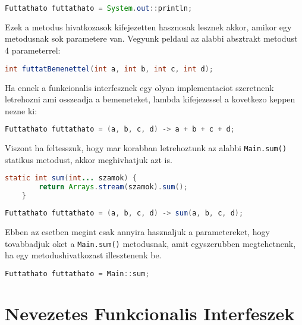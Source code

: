 \documentclass{article}
\let\l\lstinline
\begin{document}
\begin{lstlisting}[language=Java, caption=Metodus hivatkozas]
Futtathato futtathato = System.out::println;
\end{lstlisting}

Ezek a metodus hivatkozasok kifejezetten hasznosak lesznek akkor, amikor egy metodusnak sok parametere van. Vegyunk peldaul az alabbi absztrakt metodust 4 parameterrel:

\begin{lstlisting}[language=Java, caption=Absztrakt metodus 4 parameterrel]
int futtatBemenettel(int a, int b, int c, int d);
\end{lstlisting}

Ha ennek a funkcionalis interfesznek egy olyan implementaciot szeretnenk letrehozni ami osszeadja a bemeneteket, lambda kifejezessel a kovetkezo keppen nezne ki:

\begin{lstlisting}[language=Java, caption=Lambda implementacio]
Futtathato futtathato = (a, b, c, d) -> a + b + c + d;
\end{lstlisting}

\newpage

Viszont ha feltesszuk, hogy mar korabban letrehoztunk az alabbi \l{Main.sum()} statikus metodust, akkor meghivhatjuk azt is.

\begin{lstlisting}[language=Java, caption=Sum() metodus]
	static int sum(int... szamok) {
		return Arrays.stream(szamok).sum();
	}
\end{lstlisting}

\begin{lstlisting}[language=Java, caption=Lambda implementacio metodushivassal]
Futtathato futtathato = (a, b, c, d) -> sum(a, b, c, d);
\end{lstlisting}

Ebben az esetben megint csak annyira hasznaljuk a parametereket, hogy tovabbadjuk oket a \l{Main.sum()} metodusnak, amit egyszerubben megtehetnenk, ha egy metodushivatkozast illesztenenk be.

\begin{lstlisting}[language=Java, caption=Implementacio metodus hivatkozassal]
Futtathato futtathato = Main::sum;
\end{lstlisting}

\newpage

\section{Nevezetes Funkcionalis Interfeszek}
\end{document}
